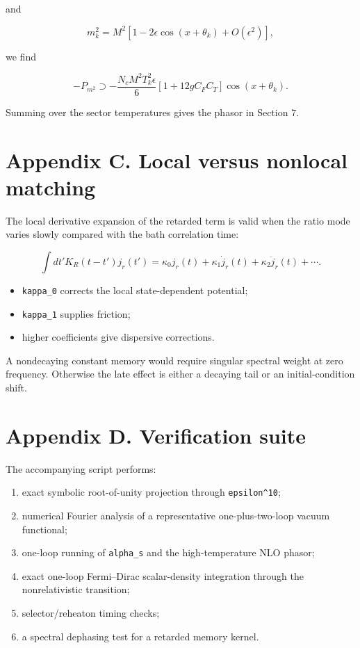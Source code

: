 \documentclass[
  10pt,
  a4paper,
]{article}
\providecommand{\tightlist}{%
  \setlength{\itemsep}{0pt}\setlength{\parskip}{0pt}}
\begin{document}
and

\[
m_k^2=M^2\left[1-2\epsilon\cos(x+\theta_k)+O(\epsilon^2)\right],
\]

we find

\[
-P_{m^2}
\supset
-\frac{N_cM^2T_k^2\epsilon}{6}
\left[1+12gC_FC_T\right]
\cos(x+\theta_k).
\]

Summing over the sector temperatures gives the phasor in Section 7.

\section{Appendix C. Local versus nonlocal
matching}\label{appendix-c.-local-versus-nonlocal-matching}

The local derivative expansion of the retarded term is valid when the
ratio mode varies slowly compared with the bath correlation time:

\[
\int dt'K_R(t-t')j_r(t')
=
\kappa_0j_r(t)+\kappa_1\dot j_r(t)+\kappa_2\ddot j_r(t)+\cdots.
\]

\begin{itemize}
\tightlist
\item
  \texttt{kappa\_0} corrects the local state-dependent potential;
\item
  \texttt{kappa\_1} supplies friction;
\item
  higher coefficients give dispersive corrections.
\end{itemize}

A nondecaying constant memory would require singular spectral weight at
zero frequency. Otherwise the late effect is either a decaying tail or
an initial-condition shift.

\section{Appendix D. Verification
suite}\label{appendix-d.-verification-suite}

The accompanying script performs:

\begin{enumerate}
\def\labelenumi{\arabic{enumi}.}
\tightlist
\item
  exact symbolic root-of-unity projection through
  \texttt{epsilon\^{}10};
\item
  numerical Fourier analysis of a representative one-plus-two-loop
  vacuum functional;
\item
  one-loop running of \texttt{alpha\_s} and the high-temperature NLO
  phasor;
\item
  exact one-loop Fermi--Dirac scalar-density integration through the
  nonrelativistic transition;
\item
  selector/reheaton timing checks;
\item
  a spectral dephasing test for a retarded memory kernel.
\end{enumerate}
\end{document}
